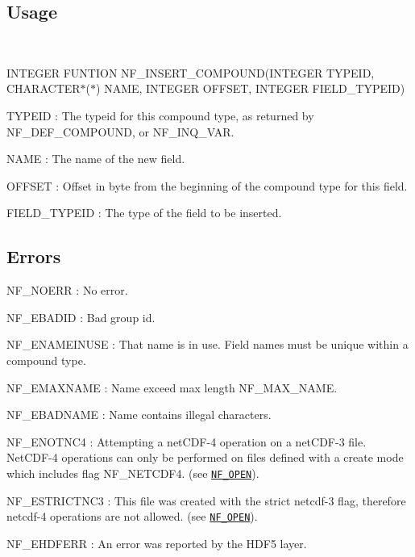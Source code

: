 \subsection*{Usage }

 

I\+N\+T\+E\+G\+ER F\+U\+N\+T\+I\+ON N\+F\+\_\+\+I\+N\+S\+E\+R\+T\+\_\+\+C\+O\+M\+P\+O\+U\+ND(I\+N\+T\+E\+G\+ER T\+Y\+P\+E\+ID, C\+H\+A\+R\+A\+C\+T\+E\+R$\ast$($\ast$) N\+A\+ME, I\+N\+T\+E\+G\+ER O\+F\+F\+S\+ET, I\+N\+T\+E\+G\+ER F\+I\+E\+L\+D\+\_\+\+T\+Y\+P\+E\+ID)

{\ttfamily T\+Y\+P\+E\+ID} \+: The typeid for this compound type, as returned by N\+F\+\_\+\+D\+E\+F\+\_\+\+C\+O\+M\+P\+O\+U\+ND, or N\+F\+\_\+\+I\+N\+Q\+\_\+\+V\+AR.

{\ttfamily N\+A\+ME} \+: The name of the new field.

{\ttfamily O\+F\+F\+S\+ET} \+: Offset in byte from the beginning of the compound type for this field.

{\ttfamily F\+I\+E\+L\+D\+\_\+\+T\+Y\+P\+E\+ID} \+: The type of the field to be inserted.

\subsection*{Errors }

{\ttfamily N\+F\+\_\+\+N\+O\+E\+RR} \+: No error.

{\ttfamily N\+F\+\_\+\+E\+B\+A\+D\+ID} \+: Bad group id.

{\ttfamily N\+F\+\_\+\+E\+N\+A\+M\+E\+I\+N\+U\+SE} \+: That name is in use. Field names must be unique within a compound type.

{\ttfamily N\+F\+\_\+\+E\+M\+A\+X\+N\+A\+ME} \+: Name exceed max length N\+F\+\_\+\+M\+A\+X\+\_\+\+N\+A\+ME.

{\ttfamily N\+F\+\_\+\+E\+B\+A\+D\+N\+A\+ME} \+: Name contains illegal characters.

{\ttfamily N\+F\+\_\+\+E\+N\+O\+T\+N\+C4} \+: Attempting a net\+C\+D\+F-\/4 operation on a net\+C\+D\+F-\/3 file. Net\+C\+D\+F-\/4 operations can only be performed on files defined with a create mode which includes flag N\+F\+\_\+\+N\+E\+T\+C\+D\+F4. (see \href{#NF_005fOPEN}{\tt N\+F\+\_\+\+O\+P\+EN}).

{\ttfamily N\+F\+\_\+\+E\+S\+T\+R\+I\+C\+T\+N\+C3} \+: This file was created with the strict netcdf-\/3 flag, therefore netcdf-\/4 operations are not allowed. (see \href{#NF_005fOPEN}{\tt N\+F\+\_\+\+O\+P\+EN}).

{\ttfamily N\+F\+\_\+\+E\+H\+D\+F\+E\+RR} \+: An error was reported by the H\+D\+F5 layer.

